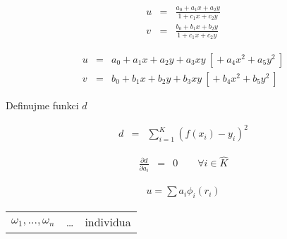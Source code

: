 \begin{eqnarray}
u&=&\frac{a_0+a_1x+a_2y}{1+c_1x+c_2y}\nonumber\\
v&=&\frac{b_0+b_1x+b_2y}{1+c_1x+c_2y}\label{perspekt}
\end{eqnarray}




\begin{eqnarray}
u&=&a_0+a_1x+a_2y+a_3xy\ [{}+a_4x^2+a_5y^2\ ]\nonumber\\
v&=&b_0+b_1x+b_2y+b_3xy\ [{}+b_4x^2+b_5y^2\ ]
\end{eqnarray}

Definujme funkci $d$ 

\begin{eqnarray}
d&=&\sum\limits_{i=1}^K (f(x_i)-y_i)^2\label{minkvad}
\end{eqnarray}

\begin{eqnarray}
\frac{\partial d}{\partial a_i}&=&0\qquad\forall i\in \hat{K}
\end{eqnarray}


\begin{itemize}

\end{itemize}


\begin{eqnarray}
u=\sum a_i\phi_i(r_i)
\end{eqnarray}





\begin{enumerate}
\begin{itemize}
\end{itemize}
\begin{itemize}
\end{itemize}
\end{enumerate}



\begin{itemize}
\end{itemize}







\begin{itemize}
\end{itemize}


\begin{tabular}{ccc}
$\omega_1,\dots,\omega_n$ &\dots& individua\\
\end{tabular}





